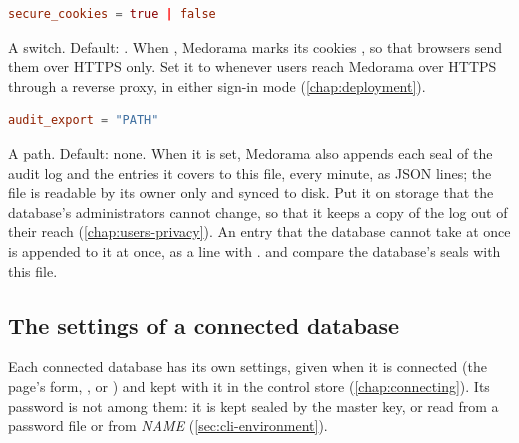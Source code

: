 \begin{lstlisting}[style=signature,language=TOML]
secure_cookies = true | false
\end{lstlisting}
A switch. Default: . When , Medorama marks its cookies , so
that browsers send them over HTTPS only. Set it to  whenever
users reach Medorama over HTTPS through a reverse proxy, in either sign-in mode
(\cref{chap:deployment}).

\begin{lstlisting}[style=signature,language=TOML]
audit_export = "PATH"
\end{lstlisting}
A path. Default: none. When it is set, Medorama also appends each seal of the audit log and the
entries it covers to this file, every minute, as JSON lines; the file is readable by its owner
only and synced to disk. Put it on storage that the database's administrators cannot change, so
that it keeps a copy of the log out of their reach (\cref{chap:users-privacy}). An entry that the
database cannot take at once is appended to it at once, as a line with .
 and  compare the database's seals with
this file.

\subsection{The settings of a connected database}
\label{sec:settings-reference-databases}

Each connected database has its own settings, given when it is connected (the page's
 form, , or ) and
kept with it in the control store (\cref{chap:connecting}). Its password is not among them: it is
kept sealed by the master key, or read from a password file or from
\textit{NAME} (\cref{sec:cli-environment}).

